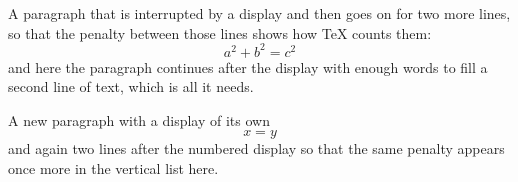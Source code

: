 \documentclass{article}
\begin{document}
A paragraph that is interrupted by a display and then goes on for two more lines, so that the penalty between those lines shows how TeX counts them:
\[ a^2 + b^2 = c^2 \]
and here the paragraph continues after the display with enough words to fill a second line of text, which is all it needs.

A new paragraph with a display of its own
\begin{equation} x = y \end{equation}
and again two lines after the numbered display so that the same penalty appears once more in the vertical list here.
\end{document}
